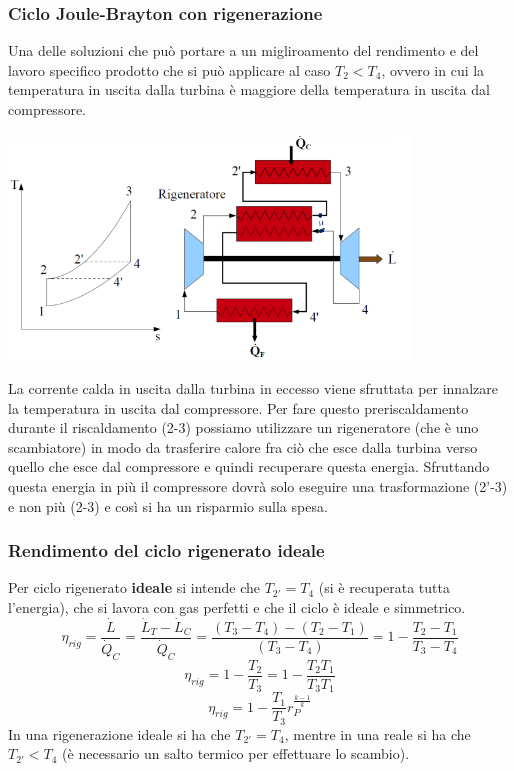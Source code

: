\subsubsection{Ciclo Joule-Brayton con rigenerazione}
Una delle soluzioni che può portare a un migliroamento del rendimento e del lavoro specifico prodotto che si può applicare al caso $T_2<T_4$, ovvero in cui la temperatura in uscita dalla turbina è maggiore della temperatura in uscita dal compressore.
\begin{center}
    \includegraphics[height=6cm]{../L07/img8.PNG}
\end{center}
La corrente calda in uscita dalla turbina in eccesso viene sfruttata per innalzare la temperatura in uscita dal compressore.\newline
\newline
Per fare questo preriscaldamento durante il riscaldamento (2-3) possiamo utilizzare un rigeneratore (che è uno scambiatore) in modo da trasferire calore fra ciò che esce dalla turbina verso quello che esce dal compressore e quindi recuperare questa energia. Sfruttando questa energia in più il compressore dovrà solo eseguire una trasformazione (2'-3) e non più (2-3) e così si ha un risparmio sulla spesa.\newline
\newline
\subsubsection{Rendimento del ciclo rigenerato ideale}
Per ciclo rigenerato \textbf{ideale} si intende che $T_{2'} = T_4$ (si è recuperata tutta l'energia), che si lavora con gas perfetti e che il ciclo è ideale e simmetrico.
\[
    \eta_{rig} = \frac{\dot{L}}{\dot{Q}_C} = \frac{\dot{L}_T - \dot{L}_C}{\dot{Q}_C} = \frac{(T_3-T_4)-(T_2-T_1)}{(T_3-T_4)} = 1- \frac{T_2-T_1}{T_3-T_4}
\]
\[
    \eta_{rig} = 1- \frac{T_2}{T_3} = 1- \frac{T_2 T_1}{T_3T_1}
\]
\[
    \eta_{rig} = 1- \frac{T_1}{T_3}r_P^{\frac{k-1}{k}}
\]
In una rigenerazione ideale si ha che $T_{2'}=T_4$, mentre in una reale si ha che $T_{2'} < T_4$ (è necessario un salto termico per effettuare lo scambio).